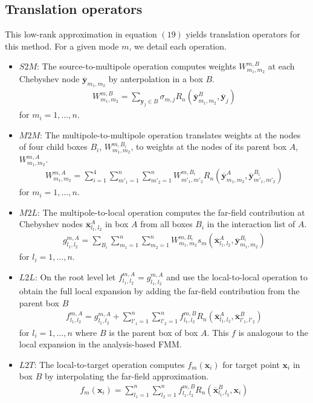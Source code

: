 \documentclass[11pt, oneside]{article}   	%
\begin{document}
\subsection{Translation operators}
This low-rank approximation in equation $(19)$ yields translation operators for this method. For a given mode $m$, we detail each operation.
\begin{itemize}
\item $S2M$: The source-to-multipole operation computes weights $W^{m,B}_{m_1,m_2}$ at each Chebyshev node $\mathbf{\overline{y}}_{m_1,m_2}$ by anterpolation in a box $B$.
\begin{align}
W_{m_1,m_2}^{m,B} = \sum_{\mathbf{y}_j\in B} \sigma_{m,j} R_n(\mathbf{\overline{y}}^B_{m_1,m_2},\mathbf{\overline{y}}_j)
\end{align}
for $m_i = 1,\dots,n$.
\item $M2M$: The multipole-to-multipole operation translates weights at the nodes of four child boxes $B_i$, $W_{m_1,m_2}^{m,B_i}$, to weights at the nodes of its parent box $A$, $W_{m_1,m_2}^{m,A}$.
\begin{align}
W_{m_1,m_2}^{m,A} = \sum_{i=1}^4 \sum_{m'_1=1}^n\sum_{m'_2=1}^n W_{m'_1,m'_2}^{m,B_i} R_n(\mathbf{\overline{y}}^A_{m_1,m_2},\mathbf{\overline{y}}^{B_i}_{m'_1,m'_2})
\end{align}
for $m_i= 1,\dots,n$.
\item $M2L$: The multipole-to-local operation computes the far-field contribution at Chebyshev nodes $\mathbf{\overline{x}}_{l_1,l_2}^A$ in box $A$ from all boxes $B_i$ in the interaction list of $A$.
\begin{align}
g_{l_1,l_2}^{m,A} = \sum_{B_i} \sum_{m_1=1}^n\sum_{m_2=1}^n W_{m_1,m_2}^{m,B_i} s_m(\mathbf{\overline{x}}^{A}_{l_1,l_2},\mathbf{\overline{y}}^{B_i}_{m_1,m_2})
\end{align}
for $l_i = 1,\dots,n$.
\item $L2L$: On the root level let $f^{m,A}_{l_1,l_2}=g^{m,A}_{l_1,l_2}$ and use the local-to-local operation to obtain the full local expansion by adding the far-field contribution from the parent box $B$
\begin{align}
f^{m,A}_{l_1,l_2}=g^{m,A}_{l_1,l_2} + \sum_{l'_1=1}^n \sum_{l'_2=1}^n f^{m,B}_{l_1,l_2} R_n(\mathbf{\overline{x}}_{l_1,l_2}^A,\mathbf{\overline{x}}_{l'_1,l'_2}^B)
\end{align}
for $l_i = 1,\dots,n$ where $B$ is the parent box of box $A$. This $f$ is analogous to the local expansion in the analysis-based FMM.
\item $L2T$: The local-to-target operation computes $f_m(\mathbf{x}_i)$ for target point $\mathbf{x}_i$ in box $B$ by interpolating the far-field approximation.
\begin{align}
f_m(\mathbf{x}_i)=\sum_{l_1=1}^n \sum_{l_2=1}^n f^{m,B}_{l_1,l_2} R_n(\mathbf{\overline{x}}_{l_1,l_2}^B,\mathbf{x}_i)
\end{align}
\end{itemize}
\end{document}
